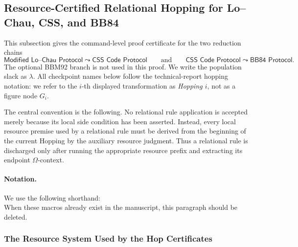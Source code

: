 \documentclass{report}
\theoremstyle{defn_style}
\newcommand{\asteq}{\mathrel{*}=}
\providecommand{\res}{\mathsf{res}}
\providecommand{\rel}{\mathsf{rel}}
\providecommand{\Live}{\operatorname{Live}}
\providecommand{\Fresh}{\operatorname{Fresh}}
\providecommand{\AllocOK}{\operatorname{AllocOK}}
\providecommand{\Own}{\operatorname{Own}}
\providecommand{\Req}{\operatorname{Req}_{\mathsf{res}}}
\providecommand{\acc}{\operatorname{acc}}
\providecommand{\upd}{\operatorname{upd}}
\providecommand{\Obs}{\operatorname{Obs}}
\providecommand{\susp}{\mathsf{susp}}
\providecommand{\HopLC}[1]{\mathsf{LC}^{[#1]}}
\providecommand{\HopBB}[1]{\mathsf{BB}^{[#1]}}
\providecommand{\Out}{\mathsf{Out}}
\providecommand{\term}{\mathsf{term}}
\begin{document}
\newpage

\subsection{Resource-Certified Relational Hopping for Lo--Chau, CSS, and BB84}
\label{subsec:resource-certified-hopping-final}

This subsection gives the command-level proof certificate for the two reduction
chains
\[
  \textsf{Modified Lo--Chau Protocol}
  \leadsto
  \textsf{CSS Code Protocol}
  \qquad\text{and}\qquad
  \textsf{CSS Code Protocol}
  \leadsto
  \textsf{BB84 Protocol}.
\]
The optional BBM92 branch is not used in this proof.  We write the population
slack as \(\lambda\).  All checkpoint names below follow the technical-report
hopping notation: we refer to the \(i\)-th displayed transformation as
\emph{Hopping \(i\)}, not as a figure node \(G_i\).

The central convention is the following.  No relational rule application is
accepted merely because its local side condition has been asserted.  Instead,
every local resource premise used by a relational rule must be derived from the
beginning of the current Hopping by the auxiliary resource judgment.  Thus a
relational rule is discharged only after running the appropriate resource prefix
and extracting its endpoint \(\Omega\)-context.

\paragraph{Notation.}
We use the following shorthand:
\[
\providecommand{\res}{\mathsf{res}}
\providecommand{\rel}{\mathsf{rel}}
\providecommand{\Live}{\operatorname{Live}}
\providecommand{\Fresh}{\operatorname{Fresh}}
\providecommand{\AllocOK}{\operatorname{AllocOK}}
\providecommand{\Own}{\operatorname{Own}}
\providecommand{\Req}{\operatorname{Req}_{\mathsf{res}}}
\providecommand{\acc}{\operatorname{acc}}
\providecommand{\upd}{\operatorname{upd}}
\providecommand{\Obs}{\operatorname{Obs}}
\providecommand{\susp}{\mathsf{susp}}
\providecommand{\asteq}{\mathrel{\ast\!\!=}}
\providecommand{\HopLC}[1]{\mathsf{LC}^{[#1]}}
\providecommand{\HopBB}[1]{\mathsf{BB}^{[#1]}}
\providecommand{\Out}{\mathsf{Out}}
\providecommand{\term}{\mathsf{term}}
\]
When these macros already exist in the manuscript, this paragraph should be
deleted.

\subsubsection{The Resource System Used by the Hop Certificates}
\label{subsubsec:resource-system-hop-certificates-final}
\end{document}
